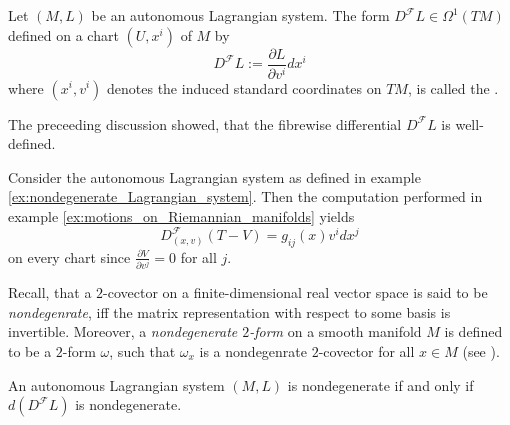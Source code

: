 \begin{definition}
	\label{def:fibrewise_differential}
	Let $(M,L)$ be an autonomous Lagrangian system. The form $D^\mathcal{F}L \in \Omega^1(TM)$ defined on a chart $(U,x^i)$ of $M$ by
	\begin{equation}
		\label{eq:fibrewise_differential}
		D^\mathcal{F}L := \frac{\partial L}{\partial v^i}dx^i
	\end{equation}
	\noindent where $(x^i,v^i)$ denotes the induced standard coordinates on $TM$, is called the .
\end{definition}

\begin{remark}
	The preceeding discussion showed, that the fibrewise differential $D^\mathcal{F}L$ is well-defined.
\end{remark}

\begin{example}
	\label{ex:fibrewise_differential_Riemannian_manifold}
	Consider the autonomous Lagrangian system as defined in example \ref{ex:nondegenerate_Lagrangian_system}. Then the computation performed in example \ref{ex:motions_on_Riemannian_manifolds} yields
	\begin{equation*}
		D_{(x,v)}^\mathcal{F}(T - V) = g_{ij}(x)v^idx^j
	\end{equation*}
	\noindent on every chart since $\frac{\partial V}{\partial v^j} = 0$ for all $j$.
\end{example}

Recall, that a $2$-covector on a finite-dimensional real vector space is said to be \emph{nondegenrate}, iff the matrix representation with respect to some basis is invertible. Moreover, a \emph{nondegenerate $2$-form} on a smooth manifold $M$ is defined to be a $2$-form $\omega$, such that $\omega_x$ is a nondegenrate $2$-covector for all $x \in M$ (see \cite[565,567]{lee:smooth_manifolds:2013}). 

\begin{proposition}
	An autonomous Lagrangian system $(M,L)$ is nondegenerate if and only if $d(D^\mathcal{F}L)$ is nondegenerate.
\end{proposition}

